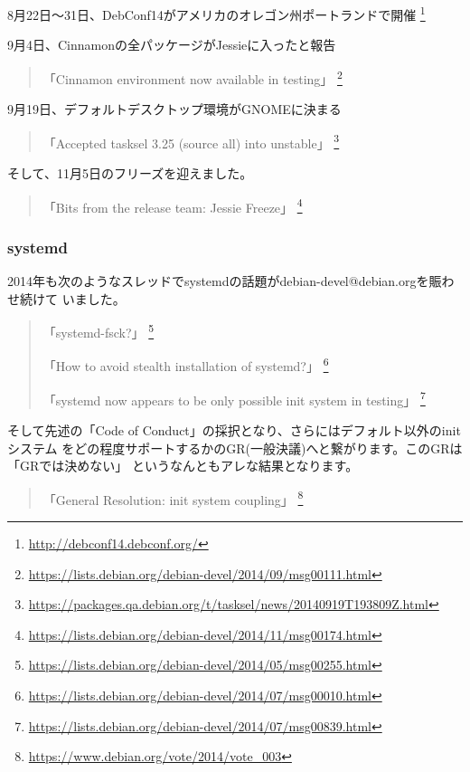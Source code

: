 \documentclass[mingoth,a4paper]{jsarticle}
\begin{document}
8月22日〜31日、DebConf14がアメリカのオレゴン州ポートランドで開催
\footnote{\url{http://debconf14.debconf.org/}}

9月4日、Cinnamonの全パッケージがJessieに入ったと報告
\begin{quote}
  「Cinnamon environment now available in testing」
  \footnote{\url{https://lists.debian.org/debian-devel/2014/09/msg00111.html}}
\end{quote}

9月19日、デフォルトデスクトップ環境がGNOMEに決まる
\begin{quote}
  「Accepted tasksel 3.25 (source all) into unstable」
  \footnote{\url{https://packages.qa.debian.org/t/tasksel/news/20140919T193809Z.html}}
\end{quote}

そして、11月5日のフリーズを迎えました。
\begin{quote}
  「Bits from the release team: Jessie Freeze」
  \footnote{\url{https://lists.debian.org/debian-devel/2014/11/msg00174.html}}
\end{quote}


\subsubsection{systemd}

2014年も次のようなスレッドでsystemdの話題がdebian-devel@debian.orgを賑わせ続けて
いました。

\begin{quote}
  「systemd-fsck?」
  \footnote{\url{https://lists.debian.org/debian-devel/2014/05/msg00255.html}}

  「How to avoid stealth installation of systemd?」
  \footnote{\url{https://lists.debian.org/debian-devel/2014/07/msg00010.html}}

  「systemd now appears to be only possible init system in testing」
  \footnote{\url{https://lists.debian.org/debian-devel/2014/07/msg00839.html}}
\end{quote}

そして先述の「Code of Conduct」の採択となり、さらにはデフォルト以外のinitシステム
をどの程度サポートするかのGR(一般決議)へと繋がります。このGRは「GRでは決めない」
というなんともアレな結果となります。

\begin{quote}
  「General Resolution: init system coupling」
  \footnote{\url{https://www.debian.org/vote/2014/vote_003}}
\end{quote}
\end{document}
